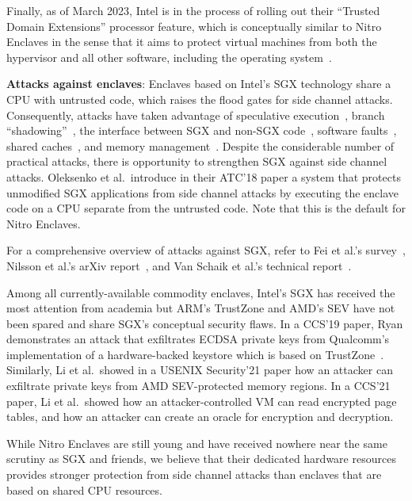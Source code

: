 Finally, as of March 2023, Intel is in the process of rolling out their
``Trusted Domain Extensions'' processor feature, which is conceptually similar
to Nitro Enclaves in the sense that it aims to protect virtual machines from
both the hypervisor and all other software, including the operating
system~\cite{tdx}.

\textbf{Attacks against enclaves}:
Enclaves based on Intel's SGX technology share a CPU with untrusted code, which
raises the flood gates for side channel attacks.  Consequently, attacks have
taken advantage of
speculative execution~\cite{VanBulck2018a,VanSchaik2021a},
branch ``shadowing''~\cite{Lee2017b},
the interface between SGX and non-SGX code~\cite{Bulck19a},
software faults~\cite{Murdock2020a},
shared caches~\cite{Brasser2017a},
and memory management~\cite{Wang2017a}.
Despite the considerable number of practical attacks, there is opportunity to
strengthen SGX against side channel attacks.  Oleksenko et al.\ introduce in
their ATC'18 paper a system that protects unmodified SGX applications from side
channel attacks by executing the enclave code on a CPU separate from the
untrusted code.  Note that this is the default for Nitro Enclaves.

For a comprehensive overview of attacks against SGX, refer to Fei et al.'s
survey~\cite{Fei2021a}, Nilsson et al.'s arXiv report~\cite{Nilsson20a}, and
Van Schaik et al.'s technical report~\cite{Schaik2022a}.

Among all currently-available commodity enclaves, Intel's SGX has received the
most attention from academia but ARM's TrustZone and AMD's SEV have not been
spared and share SGX's conceptual security flaws.  In a CCS'19 paper, Ryan
demonstrates an attack that exfiltrates ECDSA private keys from Qualcomm's
implementation of a hardware-backed keystore which is based on
TrustZone~\cite{Ryan2019a}.  Similarly, Li et al.\ showed in a USENIX
Security'21 paper how an attacker can exfiltrate private keys from AMD
SEV-protected memory regions.  In a CCS'21 paper, Li et al.\ showed how an
attacker-controlled VM can read encrypted page tables, and how an attacker can
create an oracle for encryption and decryption.

While Nitro Enclaves are still young and have received nowhere near the same
scrutiny as SGX and friends, we believe that their dedicated hardware resources
provides stronger protection from side channel attacks than enclaves
that are based on shared CPU resources.
